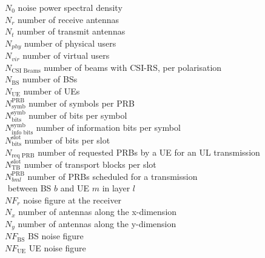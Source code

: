 $N_0$ \mytab noise power spectral density \\
$N_r$ \mytab number of receive antennas \\
$N_t$ \mytab number of transmit antennas \\
$N_{phy}$ \mytab number of physical users \\
$N_{vir}$ \mytab number of virtual users \\
$N_\text{CSI Beams}$ \mytab number of beams with CSI-RS, per polarisation \\
$N_\text{BS}$ \mytab number of \acsp{BS} \\
$N_\text{UE}$ \mytab number of \acsp{UE} \\
$N_\text{symb}^\text{PRB}$ \mytab number of symbols per PRB \\
$N_\text{bits}^\text{symb}$ \mytab number of bits per symbol \\
$N_\text{info bits}^\text{symb}$ \mytab number of information bits per symbol \\
$N_\text{bits}^\text{slot}$ \mytab number of bits per slot \\
$N_\text{req PRB}$ \mytab number of requested PRBs by a UE for an UL transmission \\
$N_\text{TB}^\text{slot}$ \mytab number of transport blocks per slot \\
$N_{bml}^\text{PRB}$ \mytab number of PRBs scheduled for a transmission \\
${ }$ \mytab between BS $b$ and UE $m$ in layer $l$ \\
$NF_r$ \mytab noise figure at the receiver \\
$N_x$ \mytab number of antennas along the x-dimension\\
$N_y$ \mytab number of antennas along the y-dimension\\
$NF_\text{BS}$ \mytab BS noise figure \\
$NF_\text{UE}$ \mytab UE noise figure\\


